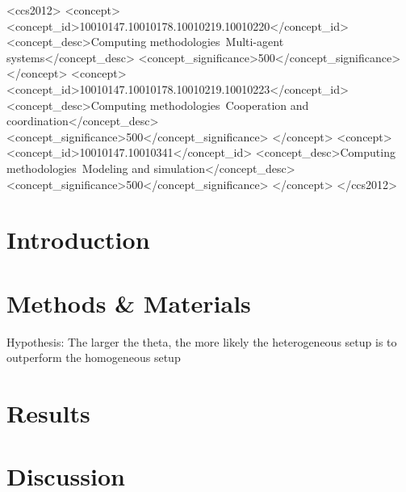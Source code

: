 \documentclass[sigconf]{aamas}  %
\begin{document}
\begin{CCSXML}
<ccs2012>
<concept>
<concept_id>10010147.10010178.10010219.10010220</concept_id>
<concept_desc>Computing methodologies~Multi-agent systems</concept_desc>
<concept_significance>500</concept_significance>
</concept>
<concept>
<concept_id>10010147.10010178.10010219.10010223</concept_id>
<concept_desc>Computing methodologies~Cooperation and coordination</concept_desc>
<concept_significance>500</concept_significance>
</concept>
<concept>
<concept_id>10010147.10010341</concept_id>
<concept_desc>Computing methodologies~Modeling and simulation</concept_desc>
<concept_significance>500</concept_significance>
</concept>
</ccs2012>
\end{CCSXML}




\maketitle



\section{Introduction}



\section{Methods \& Materials \label{preliminaries}}

Hypothesis: The larger the theta, the more likely the heterogeneous setup is to outperform the homogeneous setup



\section{Results\label{results}}
 
\section{Discussion\label{discussion}}



\balance  %
\end{document}
